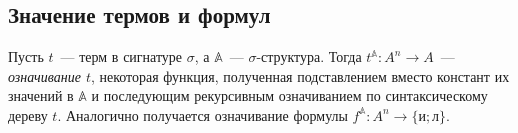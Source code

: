 \subsection{Значение термов и формул}

\begin{definition}
	Пусть $t$~— терм в сигнатуре $\sigma$, а $\mathbb{A}$~— $\sigma$-структура. Тогда $t^{\mathbb{A}}: A^n \to A$~— \emph{означивание $t$}, некоторая функция, полученная подставлением вместо констант их значений в $\mathbb{A}$ и последующим рекурсивным означиванием по синтаксическому дереву $t$. Аналогично получается означивание формулы $f^{\mathbb{A}}: A^n \to \{\text{и}; \text{л}\}$.
\end{definition}
